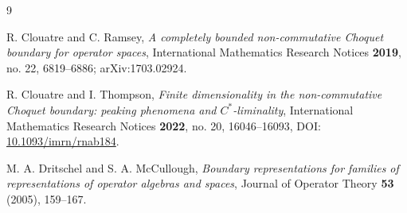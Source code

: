 \documentclass[11pt]{article}
\begin{document}
\begin{thebibliography}{9}

R. Clouatre and C. Ramsey,
\emph{A completely bounded non-commutative Choquet boundary for operator spaces},
International Mathematics Research Notices \textbf{2019}, no. 22, 6819--6886;
arXiv:1703.02924.

R. Clouatre and I. Thompson,
\emph{Finite dimensionality in the non-commutative Choquet boundary:
peaking phenomena and \(C^*\)-liminality},
International Mathematics Research Notices \textbf{2022}, no. 20,
16046--16093, DOI: \href{https://doi.org/10.1093/imrn/rnab184}{10.1093/imrn/rnab184}.

M. A. Dritschel and S. A. McCullough,
\emph{Boundary representations for families of representations of operator
algebras and spaces},
Journal of Operator Theory \textbf{53} (2005), 159--167.

\end{thebibliography}
\end{document}
